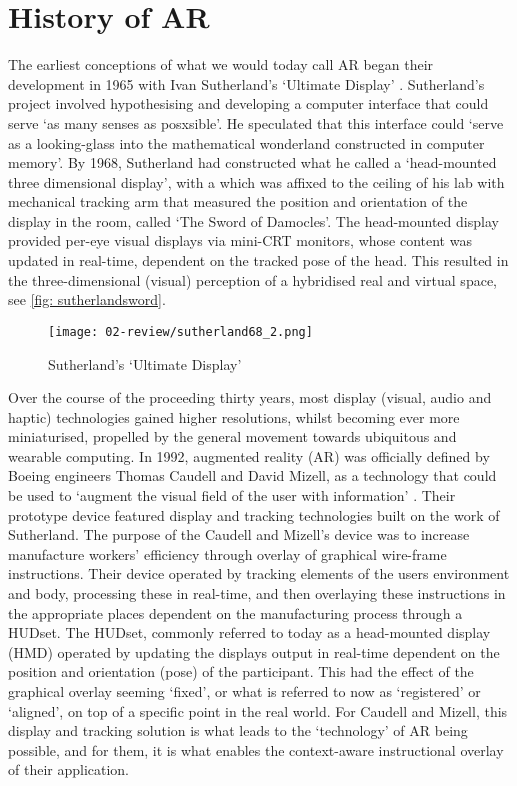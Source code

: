 \section{History of AR}\label{sec: ar-history}
The earliest conceptions of what we would today call AR began their development in 1965 with Ivan Sutherland's `Ultimate Display' \citeyearpar{sutherland1968}. Sutherland's project involved hypothesising and developing a computer interface that could serve `as many senses as posxsible'. He speculated that this interface could `serve as a looking-glass into the mathematical wonderland constructed in computer memory'. By 1968, Sutherland had constructed what he called a `head-mounted three dimensional display', with a which was affixed to the ceiling of his lab with mechanical tracking arm that measured the position and orientation of the display in the room, called `The Sword of Damocles'. The head-mounted display provided per-eye visual displays via mini-CRT monitors, whose content was updated in real-time, dependent on the tracked pose of the head. This resulted in the three-dimensional (visual) perception of a hybridised real and virtual space, see \autoref{fig: sutherlandsword}.

\begin{figure}[bth]
    \myfloatalign
    {\texttt{[image: 02-review/sutherland68\_2.png]}}
    \caption[Sutherland's `Ultimate Display']{Sutherland's `Ultimate Display'}\label{fig: sutherlandsword}
\end{figure}

Over the course of the proceeding thirty years, most display (visual, audio and haptic) technologies gained higher resolutions, whilst becoming ever more miniaturised, propelled by the general movement towards ubiquitous and wearable computing.  In 1992, augmented reality (AR) was officially defined by Boeing engineers Thomas Caudell and David Mizell, as a technology that could be used to `augment the visual field of the user with information' \citeyearpar{caudell1992}. Their prototype device featured display and tracking technologies built on the work of Sutherland. The purpose of the Caudell and Mizell’s device was to increase manufacture workers' efficiency through overlay of graphical wire-frame instructions. Their device operated by tracking elements of the users environment and body, processing these in real-time, and then overlaying these instructions in the appropriate places dependent on the manufacturing process through a HUDset. The HUDset, commonly referred to today as a head-mounted display (HMD) operated by updating the displays output in real-time dependent on the position and orientation (pose) of the participant. This had the effect of the graphical overlay seeming `fixed', or what is referred to now as `registered' or `aligned', on top of a specific point in the real world. For Caudell and Mizell, this display and tracking solution is what leads to the `technology' of AR being possible, and for them, it is what enables the context-aware instructional overlay of their application.


